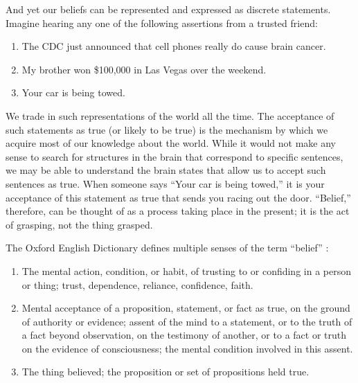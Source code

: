 \documentclass[a4paper,14pt]{extbook}
\begin{document}
And yet our beliefs can be represented and expressed as discrete statements.
Imagine hearing any one of the following assertions from a trusted friend:

\begin{enumerate}
      \item
            The CDC just announced that cell phones really do cause brain cancer.
      \item
            My brother won \$100,000 in Las Vegas over the weekend.
      \item
            Your car is being towed.

\end{enumerate}

We trade in such representations of the world all the time.
The acceptance of such statements as true (or likely to be true) is the mechanism by which we acquire most of our knowledge about the world.
While it would not make any sense to search for structures in the brain that correspond to specific sentences, we may be able to understand the brain states that allow us to accept such sentences as true.
When someone says ``Your car is being towed,'' it is your acceptance of this statement as true that sends you racing out the door.
``Belief,'' therefore, can be thought of as a process taking place in the present;
it is the act of grasping, not the thing grasped.

The Oxford English Dictionary defines multiple senses of the term ``belief'' :

\begin{enumerate}
      \item
            The mental action, condition, or habit, of trusting to or confiding in a person or thing;
            trust, dependence, reliance, confidence, faith.

      \item
            Mental acceptance of a proposition, statement, or fact as true, on the ground of authority or evidence;
            assent of the mind to a statement, or to the truth of a fact beyond observation, on the testimony of another, or to a fact or truth on the evidence of consciousness;
            the mental condition involved in this assent.

      \item
            The thing believed;
            the proposition or set of propositions held true.

\end{enumerate}
\end{document}

